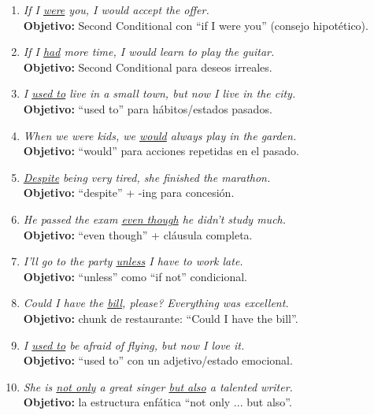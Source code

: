\documentclass[12pt,a4paper]{article}
\begin{document}
\begin{cajamineria}

\begin{enumerate}[leftmargin=1.2cm]
  \item \textit{If I \underline{were} you, I would accept the offer.}\\
    {\small\textbf{Objetivo:} Second Conditional con ``if I were you'' (consejo hipotético).}

  \item \textit{If I \underline{had} more time, I would learn to play the guitar.}\\
    {\small\textbf{Objetivo:} Second Conditional para deseos irreales.}

  \item \textit{I \underline{used to} live in a small town, but now I live in the city.}\\
    {\small\textbf{Objetivo:} ``used to'' para hábitos/estados pasados.}

  \item \textit{When we were kids, we \underline{would} always play in the garden.}\\
    {\small\textbf{Objetivo:} ``would'' para acciones repetidas en el pasado.}

  \item \textit{\underline{Despite} being very tired, she finished the marathon.}\\
    {\small\textbf{Objetivo:} ``despite'' + -ing para concesión.}

  \item \textit{He passed the exam \underline{even though} he didn't study much.}\\
    {\small\textbf{Objetivo:} ``even though'' + cláusula completa.}

  \item \textit{I'll go to the party \underline{unless} I have to work late.}\\
    {\small\textbf{Objetivo:} ``unless'' como ``if not'' condicional.}

  \item \textit{Could I have the \underline{bill}, please? Everything was excellent.}\\
    {\small\textbf{Objetivo:} chunk de restaurante: ``Could I have the bill''.}

  \item \textit{I \underline{used to} be afraid of flying, but now I love it.}\\
    {\small\textbf{Objetivo:} ``used to'' con un adjetivo/estado emocional.}

  \item \textit{She is \underline{not only} a great singer \underline{but also} a talented writer.}\\
    {\small\textbf{Objetivo:} la estructura enfática ``not only ... but also''.}
\end{enumerate}
\end{cajamineria}
\end{document}
